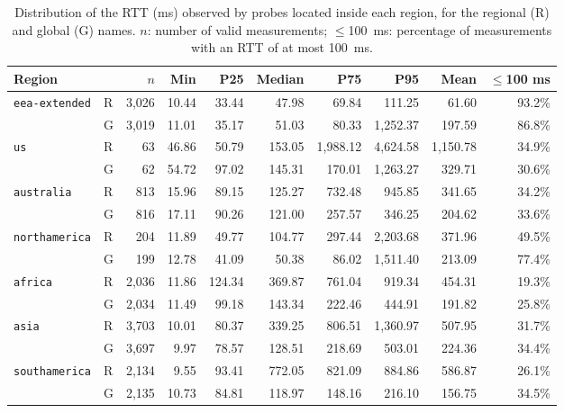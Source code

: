 \begin{table}[ht]
    \centering
    \footnotesize
    \setlength{\tabcolsep}{4pt}
    \caption{Distribution of the RTT (ms) observed by probes located inside each region, for the regional (R) and global (G) names. $n$: number of valid measurements; $\leq$100~ms: percentage of measurements with an RTT of at most 100~ms.}
    \label{tab:rcadns_rtt_stats}
    \begin{tabular}{llrrrrrrrr}
        \toprule
        \textbf{Region} & & $n$ & \textbf{Min} & \textbf{P25} & \textbf{Median} & \textbf{P75} & \textbf{P95} & \textbf{Mean} & \textbf{$\leq$100 ms} \\
        \midrule
        \texttt{eea-extended}   & R & 3{,}026 & 10.44 & 33.44 & 47.98 & 69.84 & 111.25 & 61.60 & 93.2\% \\
                                & G & 3{,}019 & 11.01 & 35.17 & 51.03 & 80.33 & 1{,}252.37 & 197.59 & 86.8\% \\
        \rowsep{10}
        \texttt{us}             & R & 63 & 46.86 & 50.79 & 153.05 & 1{,}988.12 & 4{,}624.58 & 1{,}150.78 & 34.9\% \\
                                & G & 62 & 54.72 & 97.02 & 145.31 & 170.01 & 1{,}263.27 & 329.71 & 30.6\% \\
        \rowsep{10}
        \texttt{australia}      & R & 813 & 15.96 & 89.15 & 125.27 & 732.48 & 945.85 & 341.65 & 34.2\% \\
                                & G & 816 & 17.11 & 90.26 & 121.00 & 257.57 & 346.25 & 204.62 & 33.6\% \\
        \rowsep{10}
        \texttt{northamerica}   & R & 204 & 11.89 & 49.77 & 104.77 & 297.44 & 2{,}203.68 & 371.96 & 49.5\% \\
                                & G & 199 & 12.78 & 41.09 & 50.38 & 86.02 & 1{,}511.40 & 213.09 & 77.4\% \\
        \rowsep{10}
        \texttt{africa}         & R & 2{,}036 & 11.86 & 124.34 & 369.87 & 761.04 & 919.34 & 454.31 & 19.3\% \\
                                & G & 2{,}034 & 11.49 & 99.18 & 143.34 & 222.46 & 444.91 & 191.82 & 25.8\% \\
        \rowsep{10}
        \texttt{asia}           & R & 3{,}703 & 10.01 & 80.37 & 339.25 & 806.51 & 1{,}360.97 & 507.95 & 31.7\% \\
                                & G & 3{,}697 & 9.97 & 78.57 & 128.51 & 218.69 & 503.01 & 224.36 & 34.4\% \\
        \rowsep{10}
        \texttt{southamerica}   & R & 2{,}134 & 9.55 & 93.41 & 772.05 & 821.09 & 884.86 & 586.87 & 26.1\% \\
                                & G & 2{,}135 & 10.73 & 84.81 & 118.97 & 148.16 & 216.10 & 156.75 & 34.5\% \\
        \bottomrule
    \end{tabular}
\end{table}

